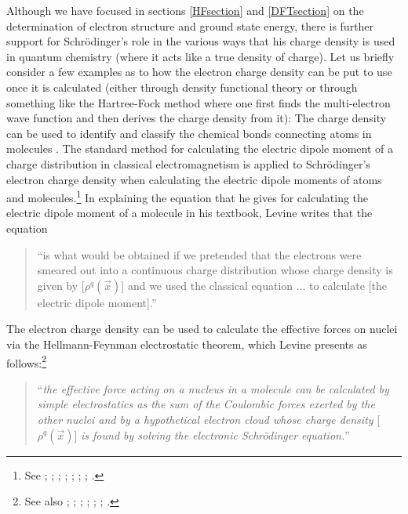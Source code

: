 \documentclass[12pt,onecolumn,secnumarabic,amsmath,amssymb,balancelastpage,nofootinbib]{article}
\begin{document}
Although we have focused in sections \ref{HFsection} and \ref{DFTsection} on the determination of electron structure and ground state energy, there is further support for Schr\"{o}dinger's role in the various ways that his charge density is used in quantum chemistry (where it acts like a true density of charge).  Let us briefly consider a few examples as to how the electron charge density can be put to use once it is calculated (either through density functional theory or through something like the Hartree-Fock method where one first finds the multi-electron wave function and then derives the charge density from it):  The charge density can be used to identify and classify the chemical bonds connecting atoms in molecules \cite{bader1990, shusterman1997, matta2002, bader2013}.  The standard method for calculating the electric dipole moment of a charge distribution in classical electromagnetism is applied to Schr\"{o}dinger's electron charge density when calculating the electric dipole moments of atoms and molecules.\footnote{See \cite[sec.\ 2]{schrodinger1926pt4}; \cite[pg.\ 1066--1068]{schrodinger1926rev}; \cite[sec.\ 3.1]{milonni1976}; \cite[sec.\ 3.4.7]{szaboQC}; \cite{bader1992}; \cite[pg.\ 2]{bader2010}; \cite[sec.\ 4.4]{bacciagaluppi2009}; \cite[sec.\ 14.2]{levineQC}.}  In explaining the equation that he gives for calculating the electric dipole moment of a molecule in his textbook, Levine \cite[pg.\ 407]{levineQC} writes that the equation
\begin{quote}
``is what would be obtained if we pretended that the electrons were smeared out into a continuous charge distribution whose charge density is given by [$\rho^q(\vec{x})$] and we used the classical equation ... to calculate [the electric dipole moment].'' 
\end{quote}
The electron charge density can be used to calculate the effective forces on nuclei via the Hellmann-Feynman electrostatic theorem, which Levine \cite[pg.\ 430]{levineQC} presents as follows:\footnote{See also \cite{feynman1939}; \cite{deb1973}; \cite[pg.\ 40]{milonni1976}; \cite[sec.\ 1.6]{parryang}; \cite[sec.\ 6.2]{gillespie2001}; \cite{bader2003}; \cite[sec.\ 4.1]{bader2010}.}
\begin{quote}
``\emph{the effective force acting on a nucleus in a molecule can be calculated by simple electrostatics as the sum of the Coulombic forces exerted by the other nuclei and by a hypothetical electron cloud whose charge density} [$\rho^q(\vec{x})$] \emph{is found by solving the electronic Schr\"{o}dinger equation.}''
\end{quote}
\end{document}
